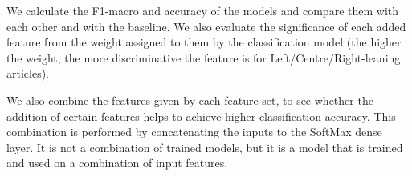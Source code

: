 We calculate the F1-macro and accuracy of the models and compare them with each other and with the baseline. %
We also evaluate the significance of each added feature from the weight assigned to them %
by the classification model (the higher the weight, the more discriminative the feature is for Left/Centre/Right-leaning articles). %

We also combine the features given by each feature set, to see whether the addition of certain features helps to achieve higher classification accuracy. %
This combination is performed by concatenating the inputs to the SoftMax dense layer. It is not a combination of trained models, but it is a model that is trained and used on a combination of input features.



